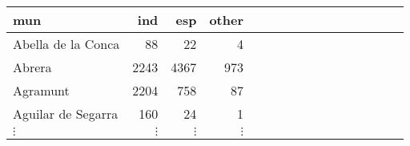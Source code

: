 \begin{table}[H]
\centering\begingroup\fontsize{7}{9}\selectfont

\begin{tabular}{lrrrlrrrlrrrlrrr}
\toprule
mun & ind & esp & other\\
\midrule
Abella de la Conca & 88 & 22 & 4\\
Abrera & 2243 & 4367 & 973\\
Agramunt & 2204 & 758 & 87\\
Aguilar de Segarra & 160 & 24 & 1\\
$\vdots$ & $\vdots$ & $\vdots$ & $\vdots$\\
\bottomrule
\end{tabular}
\endgroup{}
\end{table}
